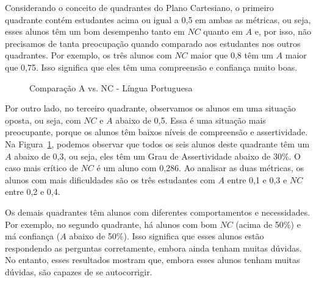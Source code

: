 Considerando o conceito de quadrantes do Plano Cartesiano, o primeiro quadrante contém estudantes acima ou igual a 0,5 em ambas as métricas, ou seja, esses alunos têm um bom desempenho tanto em $NC$ quanto em $A$ e, por isso, não precisamos de tanta preocupação quando comparado aos estudantes nos outros quadrantes. Por exemplo, os três alunos com $NC$ maior que 0,8 têm um $A$ maior que 0,75. Isso significa que eles têm uma compreensão e confiança muito boas.

\begin{figure}[htb]
\centering
{}
     \caption{Comparação A vs. NC - Língua Portuguesa}
     \label{fig:TAS_QuCL}
 \end{figure}

Por outro lado, no terceiro quadrante, observamos os alunos em uma situação oposta, ou seja, com $NC$ e $A$ abaixo de 0,5. Essa é uma situação mais preocupante, porque os alunos têm baixos níveis de compreensão e assertividade. Na Figura~\ref{fig:TAS_QuCL}, podemos observar que todos os seis alunos deste quadrante têm um $A$ abaixo de 0,3, ou seja, eles têm um Grau de Assertividade abaixo de 30\%. O caso mais crítico de $NC$ é um aluno com 0,286. Ao analisar as duas métricas, os alunos com mais dificuldades são os três estudantes com $A$ entre 0,1 e 0,3 e $NC$ entre 0,2 e 0,4.

Os demais quadrantes têm alunos com diferentes comportamentos e necessidades. Por exemplo, no segundo quadrante, há alunos com bom $NC$ (acima de 50\%) e má confiança ($A$ abaixo de 50\%). Isso significa que esses alunos estão respondendo as perguntas corretamente, embora ainda tenham muitas dúvidas.
No entanto, esses resultados mostram que, embora esses alunos tenham muitas dúvidas, são capazes de se autocorrigir.

